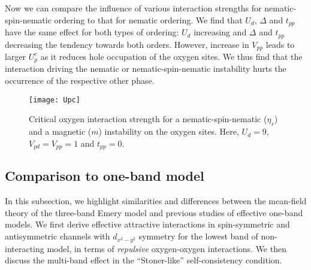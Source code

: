 \documentclass[prb, twocolumn,showpacs,preprintnumbers,amsmath,amssymb, floatfix]{revtex4}
\begin{document}
Now we can compare the influence of various interaction strengths for
nematic-spin-nematic ordering to that  for nematic ordering. We find
that $U_d$, $\Delta$ and $t_{pp}$ have the same effect for both types
of ordering: 
$U_d$ increasing and $\Delta$ and $t_{pp}$ decreasing the tendency towards
both orders. However,  increase in $V_{pp}$ leads to larger $U_{p}^c$ as it
reduces hole occupation of the oxygen sites.
We thus find that the interaction driving the nematic or nematic-spin-nematic instability hurts the occurrence of the respective other phase.

\begin{figure}[tb]
  \begin{center}
    \texttt{[image: Upc]}
  \end{center}
  \caption{Critical oxygen interaction strength for a nematic-spin-nematic ($\eta_{s}$) and a magnetic ($m$) instability on the oxygen sites. Here, $U_{d} = 9$, $V_{pd} = V_{pp} = 1$ and $t_{pp} = 0$. }
  \label{fig:Upc}
\end{figure}


\subsection{Comparison to one-band model}
\label{subsec:oneband}
 In this subsection, we highlight similarities and differences between the mean-field
theory of the three-band Emery model and previous studies of effective
one-band models. We first derive effective attractive interactions in
spin-symmetric and  antisymmetric channels with $d_{x^2-y^2}$ symmetry
for the lowest band of non-interacting model, in terms of {\em repulsive}
oxygen-oxygen interactions. We then discuss the multi-band effect in
the ``Stoner-like'' self-consistency condition. 
\end{document}
